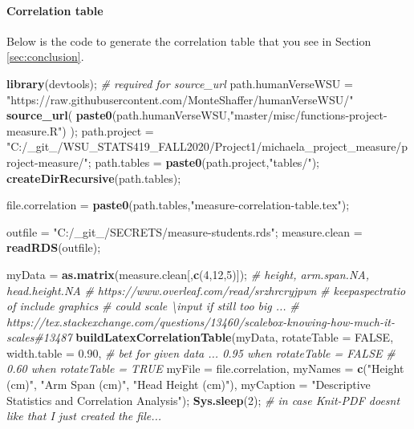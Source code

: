 \documentclass[]{article}
\newenvironment{Shaded}{\begin{snugshade}}{\end{snugshade}}
\newcommand{\CommentTok}[1]{\textcolor[rgb]{0.56,0.35,0.01}{\textit{#1}}}
\newcommand{\DataTypeTok}[1]{\textcolor[rgb]{0.13,0.29,0.53}{#1}}
\newcommand{\DecValTok}[1]{\textcolor[rgb]{0.00,0.00,0.81}{#1}}
\newcommand{\FloatTok}[1]{\textcolor[rgb]{0.00,0.00,0.81}{#1}}
\newcommand{\KeywordTok}[1]{\textcolor[rgb]{0.13,0.29,0.53}{\textbf{#1}}}
\newcommand{\NormalTok}[1]{#1}
\newcommand{\OtherTok}[1]{\textcolor[rgb]{0.56,0.35,0.01}{#1}}
\newcommand{\StringTok}[1]{\textcolor[rgb]{0.31,0.60,0.02}{#1}}
\begin{document}
\paragraph{Correlation table}
\label{sec:appendix-correlation-table}

Below is the code to generate the correlation table that you see in
Section \ref{sec:conclusion}.

\begin{Shaded}
\begin{Highlighting}[]
\KeywordTok{library}\NormalTok{(devtools);       }\CommentTok{\# required for source\_url}
\NormalTok{path.humanVerseWSU =}\StringTok{ "https://raw.githubusercontent.com/MonteShaffer/humanVerseWSU/"}
\KeywordTok{source\_url}\NormalTok{( }\KeywordTok{paste0}\NormalTok{(path.humanVerseWSU,}\StringTok{"master/misc/functions{-}project{-}measure.R"}\NormalTok{) );}
\NormalTok{path.project =}\StringTok{ "C:/\_git\_/WSU\_STATS419\_FALL2020/Project1/michaela\_project\_measure/project{-}measure/"}\NormalTok{;}
\NormalTok{path.tables =}\StringTok{ }\KeywordTok{paste0}\NormalTok{(path.project,}\StringTok{"tables/"}\NormalTok{);}
  \KeywordTok{createDirRecursive}\NormalTok{(path.tables);}


\NormalTok{file.correlation =}\StringTok{ }\KeywordTok{paste0}\NormalTok{(path.tables,}\StringTok{"measure{-}correlation{-}table.tex"}\NormalTok{);}

\NormalTok{outfile =}\StringTok{ "C:/\_git\_/SECRETS/measure{-}students.rds"}\NormalTok{;}
\NormalTok{measure.clean =}\StringTok{ }\KeywordTok{readRDS}\NormalTok{(outfile);}

\NormalTok{myData =}\StringTok{ }\KeywordTok{as.matrix}\NormalTok{(measure.clean[,}\KeywordTok{c}\NormalTok{(}\DecValTok{4}\NormalTok{,}\DecValTok{12}\NormalTok{,}\DecValTok{5}\NormalTok{)]);}
\CommentTok{\# height, arm.span.NA, head.height.NA}
\CommentTok{\# https://www.overleaf.com/read/srzhrcryjpwn}
\CommentTok{\# keepaspectratio of include graphics }
\CommentTok{\# could scale \textbackslash{}input if still too big ...}
\CommentTok{\# https://tex.stackexchange.com/questions/13460/scalebox{-}knowing{-}how{-}much{-}it{-}scales\#13487}
\KeywordTok{buildLatexCorrelationTable}\NormalTok{(myData, }
  \DataTypeTok{rotateTable =} \OtherTok{FALSE}\NormalTok{,}
  \DataTypeTok{width.table =} \FloatTok{0.90}\NormalTok{, }\CommentTok{\# bet for given data ... 0.95 when rotateTable = FALSE}
                      \CommentTok{\# 0.60 when rotateTable = TRUE}
  \DataTypeTok{myFile =}\NormalTok{ file.correlation,}
  \DataTypeTok{myNames =} \KeywordTok{c}\NormalTok{(}\StringTok{"Height (cm)"}\NormalTok{, }\StringTok{"Arm Span (cm)"}\NormalTok{, }\StringTok{"Head Height (cm)"}\NormalTok{),}
  \DataTypeTok{myCaption =} \StringTok{"Descriptive Statistics and Correlation Analysis"}\NormalTok{);}
\KeywordTok{Sys.sleep}\NormalTok{(}\DecValTok{2}\NormalTok{); }\CommentTok{\# in case Knit{-}PDF doesn\textquotesingle{}t like that I just created the file...}
\end{Highlighting}
\end{Shaded}
\end{document}
